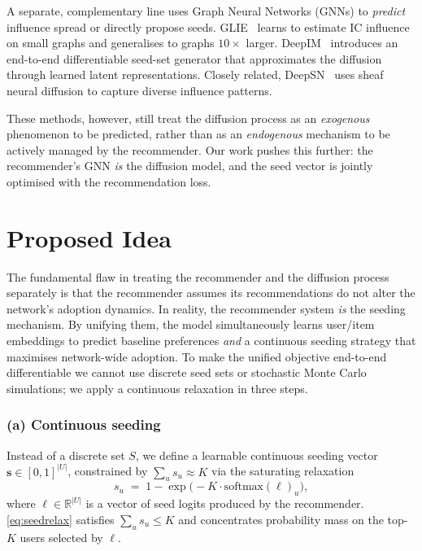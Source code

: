 \documentclass[conference]{IEEEtran}
\begin{document}
A separate, complementary line uses Graph Neural Networks (GNNs) to
\emph{predict} influence spread or directly propose seeds.
GLIE~\cite{kumar2022glie} learns to estimate IC influence on small
graphs and generalises to graphs $10\times$ larger.
DeepIM~\cite{ling2023deepim} introduces an end-to-end differentiable
seed-set generator that approximates the diffusion through learned
latent representations. Closely related,
DeepSN~\cite{wang2024deepsn} uses sheaf neural diffusion to capture
diverse influence patterns.

These methods, however, still treat the diffusion process as an
\emph{exogenous} phenomenon to be predicted, rather than as an
\emph{endogenous} mechanism to be actively managed by the recommender.
Our work pushes this further: the recommender's GNN \emph{is} the
diffusion model, and the seed vector is jointly optimised with the
recommendation loss.

\section{Proposed Idea}

The fundamental flaw in treating the recommender and the diffusion
process separately is that the recommender assumes its recommendations
do not alter the network's adoption dynamics. In reality, the
recommender system \emph{is} the seeding mechanism. By unifying them,
the model simultaneously learns user/item embeddings to predict baseline
preferences \emph{and} a continuous seeding strategy that maximises
network-wide adoption. To make the unified objective end-to-end
differentiable we cannot use discrete seed sets or stochastic Monte
Carlo simulations; we apply a continuous relaxation in three steps.

\subsubsection*{(a) Continuous seeding}
Instead of a discrete set $S$, we define a learnable continuous seeding
vector $\mathbf{s}\in[0,1]^{|U|}$, constrained by
$\sum_u s_u\!\approx\!K$ via the saturating relaxation
\begin{equation}
s_u \;=\; 1-\exp\!\bigl(-K\cdot\mathrm{softmax}(\boldsymbol{\ell})_u\bigr),
\label{eq:seedrelax}
\end{equation}
where $\boldsymbol{\ell}\in\mathbb{R}^{|U|}$ is a vector of seed logits
produced by the recommender. \eqref{eq:seedrelax} satisfies
$\sum_u s_u\!\le\!K$ and concentrates probability mass on the top-$K$
users selected by $\boldsymbol{\ell}$.
\end{document}
